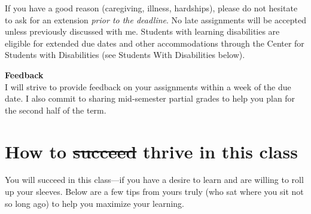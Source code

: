 \documentclass[11pt]{article}
\begin{document}
If you have a good reason (caregiving, illness, hardships), please do not hesitate to ask for  an extension \emph{prior to the deadline}. No late assignments will be accepted unless previously discussed with me. Students with learning disabilities are eligible for extended due dates and other accommodations through the Center for Students with Disabilities (see Students With Disabilities below).

\textbf{Feedback}\\
I will strive to provide feedback on your assignments within a week of the due date. I also commit to sharing mid-semester partial grades to help you plan for the second half of the term.

\section*{How to \st{succeed} thrive in this class}
You will succeed in this class---if you have a desire to learn and are willing
to roll up your sleeves. Below are a few tips from yours truly (who sat where
you sit not so long ago) to help you maximize your learning.
\end{document}
